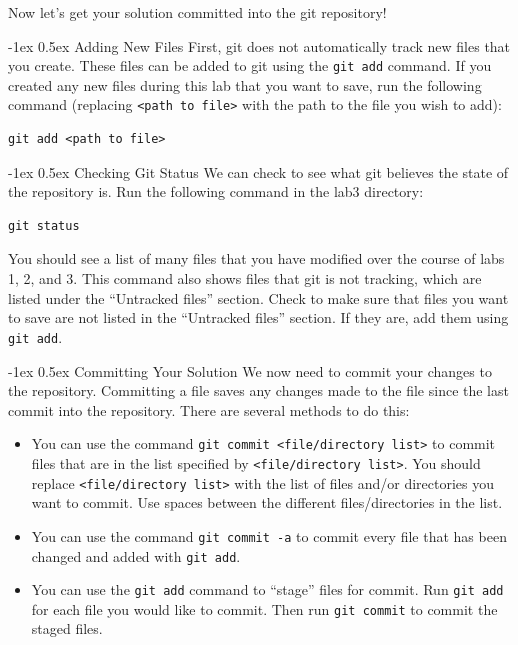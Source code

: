 \documentclass[11pt]{article}
\makeatletter
\renewcommand{\subsection}
{\@startsection {subsection}{1}{0pt}
 {-1ex}
 {0.5ex}
 {\bfseries\normalsize}}
\makeatother
\begin{document}
Now let's get your solution committed into the git repository!

\subsection{Adding New Files}
First, git does not automatically track new files that you create.  These files can be added to git using the \verb|git add| command.  If you created any new files during this lab that you want to save, run the following command (replacing \verb|<path to file>| with the path to the file you wish to add):
\begin{verbatim}
git add <path to file>
\end{verbatim}

\subsection{Checking Git Status}
We can check to see what git believes the state of the repository is.  Run the following command in the lab3 directory:
\begin{verbatim}
git status
\end{verbatim}
You should see a list of many files that you have modified over the course of labs 1, 2, and 3.  This command also shows files that git is not tracking, which are listed under the ``Untracked files'' section.  Check to make sure that files you want to save are not listed in the ``Untracked files'' section.  If they are, add them using \verb|git add|.

\subsection{Committing Your Solution}
We now need to commit your changes to the repository.  Committing a file saves any changes made to the file since the last commit into the repository.  There are several methods to do this:
\begin{itemize}
\item You can use the command \verb|git commit <file/directory list>| to commit files that are in the list specified by \verb|<file/directory list>|.  You should replace \verb|<file/directory list>| with the list of files and/or directories you want to commit.  Use spaces between the different files/directories in the list.
\item You can use the command \verb|git commit -a| to commit every file that has been changed and added with \verb|git add|.
\item You can use the \verb|git add| command to ``stage'' files for commit.  Run \verb|git add| for each file you would like to commit.  Then run \verb|git commit| to commit the staged files.
\end{itemize}
\end{document}
